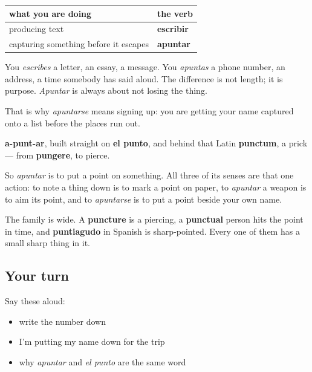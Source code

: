 \begin{grammarlens}[title={Grammar Lens: apuntar is not escribir}]
\noindent
\begin{tabularx}{\linewidth}{@{}>{\raggedright\arraybackslash}X>{\raggedright\arraybackslash}X@{}}
\toprule
\textbf{what you are doing} & \textbf{the verb} \\
\midrule
producing text & \textbf{escribir} \\
capturing something before it escapes & \textbf{apuntar} \\
\bottomrule
\end{tabularx}

You \emph{escribes} a letter, an essay, a message. You \emph{apuntas} a phone number, an address, a time somebody has said aloud. The difference is not length; it is purpose. \emph{Apuntar} is always about not losing the thing.

That is why \emph{apuntarse} means signing up: you are getting your name captured onto a list before the places run out.
\end{grammarlens}

\begin{cousinweb}
\textbf{a-punt-ar}, built straight on \textbf{el punto}, and behind that Latin \textbf{punctum}, a prick — from \textbf{pungere}, to pierce.

So \emph{apuntar} is to put a point on something. All three of its senses are that one action: to note a thing down is to mark a point on paper, to \emph{apuntar} a weapon is to aim its point, and to \emph{apuntarse} is to put a point beside your own name.

The family is wide. A \textbf{puncture} is a piercing, a \textbf{punctual} person hits the point in time, and \textbf{puntiagudo} in Spanish is sharp-pointed. Every one of them has a small sharp thing in it.
\end{cousinweb}

\subsection*{Your turn}
Say these aloud:

\begin{itemize}
\raggedright
  \item write the number down
  \item I'm putting my name down for the trip
  \item why \emph{apuntar} and \emph{el punto} are the same word
\end{itemize}

